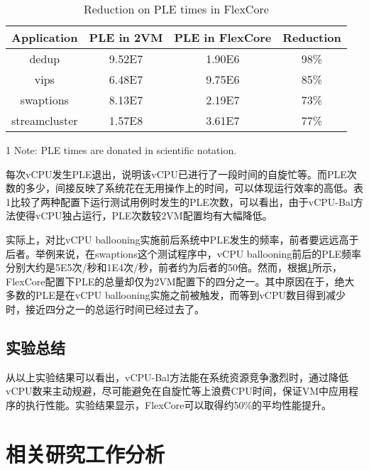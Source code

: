 \begin{table}[!htbp]
\caption{Reduction on PLE times in FlexCore}\label{tab:ple}
\vspace{5mm}
\centering
\begin{threeparttable}
\begin{tabular}{cccc}
\toprule
Application & PLE in 2VM & PLE in FlexCore & Reduction\\
\midrule
  dedup & 9.52E7\tnote{1} & 1.90E6 & 98\%\\
  vips & 6.48E7 & 9.75E6 & 85\%\\
  swaptions & 8.13E7 & 2.19E7 & 73\%\\
  streamcluster & 1.57E8 & 3.61E7 & 77\%\\
\bottomrule
\end{tabular}
\begin{tablenotes}
\footnotesize
\item[1] Note: PLE times are donated in scientific notation.
\end{tablenotes}
\end{threeparttable}
\end{table}

每次vCPU发生PLE退出，说明该vCPU已进行了一段时间的自旋忙等。而PLE次数的多少，间接反映了系统花在无用操作上的时间，可以体现运行效率的高低。表1比较了两种配置下运行测试用例时发生的PLE次数，可以看出，由于vCPU-Bal方法使得vCPU独占运行，PLE次数较2VM配置均有大幅降低。

实际上，对比vCPU ballooning实施前后系统中PLE发生的频率，前者要远远高于后者。举例来说，在swaptions这个测试程序中，vCPU ballooning前后的PLE频率分别大约是5E5次/秒和1E4次/秒，前者约为后者的50倍。然而，根据\ref{tab:ple}所示，FlexCore配置下PLE的总量却仅为2VM配置下的四分之一。其中原因在于，绝大多数的PLE是在vCPU ballooning实施之前被触发，而等到vCPU数目得到减少时，接近四分之一的总运行时间已经过去了。

\subsection{实验总结}

从以上实验结果可以看出，vCPU-Bal方法能在系统资源竞争激烈时，通过降低vCPU数来主动规避，尽可能避免在自旋忙等上浪费CPU时间，保证VM中应用程序的执行性能。实验结果显示，FlexCore可以取得约50\%的平均性能提升。

\section{相关研究工作分析}

